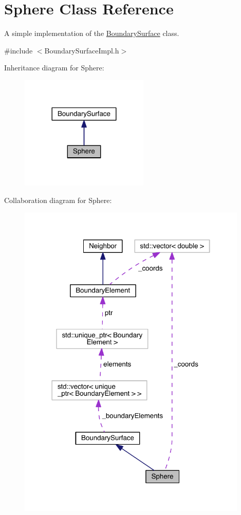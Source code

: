 \hypertarget{classSphere}{\section{Sphere Class Reference}
\label{classSphere}
}


A simple implementation of the \hyperlink{classBoundarySurface}{Boundary\+Surface} class.  




{\ttfamily \#include $<$Boundary\+Surface\+Impl.\+h$>$}



Inheritance diagram for Sphere\+:\nopagebreak
\begin{figure}[H]
\begin{center}
\leavevmode
\includegraphics[width=173pt]{classSphere__inherit__graph}
\end{center}
\end{figure}


Collaboration diagram for Sphere\+:\nopagebreak
\begin{figure}[H]
\begin{center}
\leavevmode
\includegraphics[width=310pt]{classSphere__coll__graph}
\end{center}
\end{figure}

